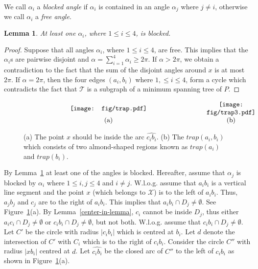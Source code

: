 \documentclass[11pt,a4paper]{article}
\newtheorem{lemma}{Lemma}
\begin{document}
We call $\alpha_i$ a {\em blocked angle} if $\alpha_i$ is contained in an angle $\alpha_j$ where $j\neq i$, otherwise we call $\alpha_i$ a {\em free angle}.

\begin{lemma}
\label{not-all-free-angles}
At least one $\alpha_i$, where $1\le i \le 4$, is blocked.
\end{lemma}
\begin{proof}
Suppose that all angles $\alpha_i$, where $1\le i \le 4$, are free. This implies that the $\alpha_i$s are pairwise disjoint and $\alpha=\sum_{i=1}^{4}{\alpha_i} \ge 2\pi$. If $\alpha > 2\pi$, we obtain a contradiction to the fact that the sum of the disjoint angles around $x$ is at most $2\pi$. If $\alpha = 2\pi$, then the four edges $(a_i,b_i)$ where $1,\le i\le 4$, form a cycle which contradicts the fact that $\mathcal{T}$ is a subgraph of a minimum spanning tree of $P$.
\end{proof}

\begin{figure}[htb]
  \centering
\setlength{\tabcolsep}{0in}
  $\begin{tabular}{cc}
 \multicolumn{1}{m{.7\columnwidth}}{\centering\texttt{[image: fig/trap.pdf]}}
&\multicolumn{1}{m{.3\columnwidth}}{\centering\texttt{[image: fig/trap3.pdf]}}\\
(a) & (b)
\end{tabular}$
  \caption{(a) The point $x$ should be inside the arc $\widehat{c_ib_i}$. (b) The $trap(a_i,b_i)$ which consists of two almond-shaped regions known as $trap(a_i)$ and $trap(b_i)$.}
\label{trap-fig}
\end{figure}

By Lemma~\ref{not-all-free-angles} at least one of the angles is blocked. Hereafter, assume that $\alpha_j$ is blocked by $\alpha_i$ where $1\le i,j\le 4$ and $i\neq j$. W.l.o.g. assume that $a_ib_i$ is a vertical line segment and the point $x$ (which belongs to $\mathcal{X}$) is to the left of $a_ib_i$. Thus, $a_jb_j$ and $c_j$ are to the right of $a_ib_i$. This implies that $a_ib_i\cap D_j\neq \emptyset$. See Figure~\ref{trap-fig}(a). By Lemma~\ref{center-in-lemma}, $c_i$ cannot be inside $D_j$, thus either $a_ic_i\cap D_j\neq \emptyset$ or $c_ib_i\cap D_j \neq\emptyset$, but not both. W.l.o.g. assume that $c_ib_i\cap D_j\neq \emptyset$. Let $C'$ be the circle with radius $|c_ib_i|$ which is centred at $b_i$. Let $d$ denote the intersection of $C'$ with $C_i$ which is to the right of $c_ib_i$. Consider the circle $C''$ with radius $|xb_i|$ centred at $d$. Let $\widehat{c_ib_i}$ be the closed arc of $C''$ to the left of $c_ib_i$ as shown in Figure~\ref{trap-fig}(a).
\end{document}
